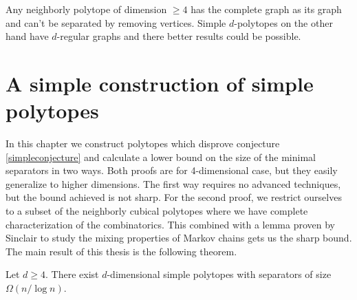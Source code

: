 Any neighborly polytope of dimension $\geq 4$ has the complete graph as 
its graph and can't be separated by removing vertices. Simple 
$d$-polytopes on the other hand have $d$-regular graphs and there better results could be 
possible.

%
%
%
%



\chapter{A simple construction of simple polytopes}

In this chapter we construct polytopes which disprove conjecture \ref{simpleconjecture} and
calculate a lower bound on the size of the minimal separators in two ways. Both proofs are for 
4-dimensional case, but they easily generalize to higher dimensions. The first way requires
no advanced techniques, but the bound achieved is not sharp. For the second proof,
we restrict ourselves to a subset of the neighborly cubical polytopes where we have complete
characterization of the combinatorics. This combined with a lemma proven by Sinclair to study
the mixing properties of Markov chains gets us the sharp bound. The main result of this
thesis is the following theorem.


\begin{theorem}
\label{maintheorem}
 Let $d\geq 4$. There exist $d$-dimensional simple polytopes with
separators of size $\Omega(n/\log n)$.
\end{theorem}

